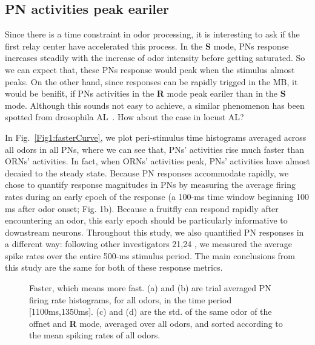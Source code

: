 \documentclass[12pt, a4paper]{article}
\begin{document}
\subsection{PN activities peak eariler}
Since there is a time constraint in odor processing, it is interesting to ask if the first relay center have accelerated this process. In the {\bf S} mode, PNs response increases steadily with the increase of odor intensity before getting saturated. So we can expect that, these PNs response would peak when the stimulus almost peaks. On the other hand, since responses can be rapidly trigged in the MB, it would be benifit, if PNs activities in the {\bf R} mode peak eariler than in the {\bf S} mode. Although this sounds not easy to achieve, a similar phenomenon has been spotted from drosophila AL~\citep{}. How about the case in locust AL?

In Fig.~\ref{Fig1:fasterCurve}, we plot peri-stimulus time histograms averaged across all odors in all PNs, where we can see that, PNs' activities rise much faster than ORNs' activities. In fact, when ORNs' activities peak, PNs' activities have almost decaied to the steady state. Because PN responses accommodate rapidly, we chose to quantify response magnitudes in PNs by measuring the average firing rates during an early epoch of the response (a 100-ms time window beginning 100 ms after odor onset; Fig. 1b). Because a fruitfly can respond rapidly after encountering an odor, this early epoch should be particularly informative to downstream neurons. Throughout this study, we also quantified PN responses in a different way: following other investigators 21,24 , we measured the average spike rates over the entire 500-ms stimulus period. The main conclusions from this study are the same for both of these response metrics.


\begin{figure}[htbp]\centering
    \hspace{0.5cm}
\caption[Peak~eariler]{\label{Figure1:peakEariler} \small Faster, which means more fast. (a) and (b) are trial averaged PN firing rate histograms, for all odors, in the time period [1100ms,1350ms]. (c) and (d) are the std. of the same odor of the offnet and {\bf R} mode, averaged over all odors, and sorted according to the mean spiking rates of all odors.}
\end{figure}
\end{document}
